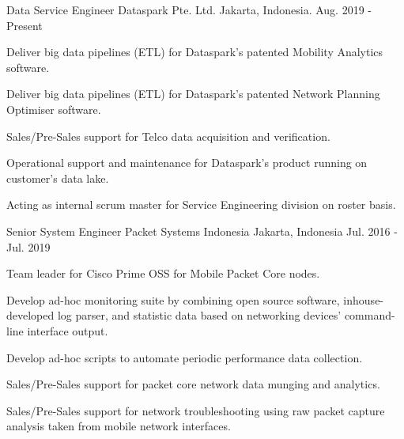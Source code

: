 

\begin{cventries}

  \cventry
    {Data Service Engineer} %
    {Dataspark Pte. Ltd.} %
    {Jakarta, Indonesia.} %
    {Aug. 2019 - Present} %
    {
      \begin{cvitems} %
        \item {Deliver big data pipelines (ETL) for Dataspark's patented Mobility Analytics software.}
        \item {Deliver big data pipelines (ETL) for Dataspark's patented Network Planning Optimiser software.}
        \item {Sales/Pre-Sales support for Telco data acquisition and verification.}
        \item {Operational support and maintenance for Dataspark's product running on customer's data lake.}
        \item {Acting as internal scrum master for Service Engineering division on roster basis.}
      \end{cvitems}
    }

  \cventry
    {Senior System Engineer} %
    {Packet Systems Indonesia} %
    {Jakarta, Indonesia} %
    {Jul. 2016 - Jul. 2019} %
    {
      \begin{cvitems} %
        \item {Team leader for Cisco Prime OSS for Mobile Packet Core nodes.}
        \item {Develop ad-hoc monitoring suite by combining open source software, inhouse-developed log parser, and statistic data based on networking devices' command-line interface output.}
        \item {Develop ad-hoc scripts to automate periodic performance data collection.}
        \item {Sales/Pre-Sales support for packet core network data munging and analytics.}
        \item {Sales/Pre-Sales support for network troubleshooting using raw packet capture analysis taken from mobile network interfaces.}
      \end{cvitems}
    }


\end{cventries}
